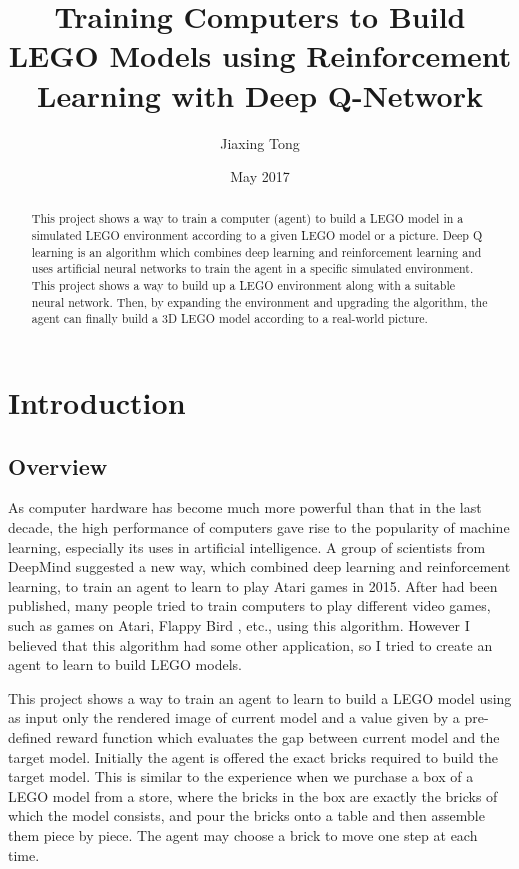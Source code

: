\documentclass[a4paper]{article}
\title{Training Computers to Build LEGO Models using Reinforcement Learning with Deep Q-Network}
\author{Jiaxing Tong }
\date{May 2017}
\begin{document}
    \maketitle
    
    \begin{abstract}
        This project shows a way to train a computer (agent) to
        build a LEGO model in a simulated LEGO environment 
        according to a given LEGO model or a picture. Deep Q learning \cite{human-level,DQN}
        is an algorithm which combines deep learning and reinforcement
        learning and uses artificial neural networks to train the
        agent in a specific simulated environment. This project shows
        a way to build up a LEGO environment along with a suitable
        neural network. Then, by expanding the environment and
        upgrading the algorithm, the agent can finally build a 3D
        LEGO model according to a real-world picture. 	
    \end{abstract}
    
    \newpage
    \tableofcontents
    \newpage

    \section{Introduction}
        \subsection{Overview}
            As computer hardware has become much more powerful than that
            in the last decade, the high performance of computers gave
            rise to the popularity of machine learning, especially its
            uses in artificial intelligence. A group of scientists from
            DeepMind suggested a new way, which combined deep learning
            and reinforcement learning, to train an agent to learn to
            play Atari games \cite{intro-rl} in 2015. After \cite{intro-rl} had been published,
            many people tried to train computers to play different video
            games, such as games on Atari, Flappy Bird \cite{flappy-bird1,flappy-bird2}, etc., using
            this algorithm. However I believed that this algorithm had
            some other application, so I tried to create an agent to learn
            to build LEGO models. 
            
            This project shows a way to train an agent to learn to build
            a LEGO model using as input only the rendered image of current
            model and a value given by a pre-defined reward function which
            evaluates the gap between current model and the target model.
            Initially the agent is offered the exact bricks required to
            build the target model. This is similar to the experience when
            we purchase a box of a LEGO model from a store, where the bricks
            in the box are exactly the bricks of which the model consists,
            and pour the bricks onto a table and then assemble them piece
            by piece. The agent may choose a brick to move one step at each
            time. 
            
\end{document}
